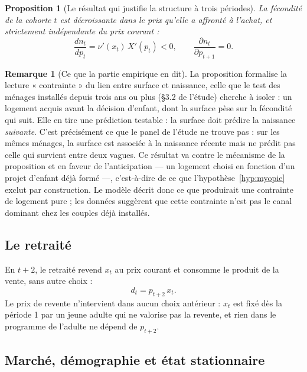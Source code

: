 \documentclass[11pt,a4paper]{article}
\theoremstyle{plain}
\newtheorem{proposition}{Proposition}
\theoremstyle{definition}
\newtheorem{remarque}{Remarque}
\begin{document}
\begin{proposition}[Le résultat qui justifie la structure à trois périodes]\label{prop:coeur}
La fécondité de la cohorte $t$ est décroissante dans le prix qu'elle a affronté à l'achat, et strictement indépendante du prix courant :
\begin{equation}\label{eq:dn-dp}
\frac{d n_t}{d p_t} = \nu'(x_t)\, X'(p_t) < 0 , \qquad \frac{\partial n_t}{\partial p_{t+1}} = 0 .
\end{equation}
\end{proposition}

\begin{remarque}[Ce que la partie empirique en dit]\label{rem:correspondance}
La proposition formalise la lecture « contrainte » du lien entre surface et naissance, celle que le test des ménages installés depuis trois ans ou plus (§3.2 de l'étude) cherche à isoler : un logement acquis avant la décision d'enfant, dont la surface pèse sur la fécondité qui suit. Elle en tire une prédiction testable : la surface doit prédire la naissance \emph{suivante}. C'est précisément ce que le panel de l'étude ne trouve pas : sur les mêmes ménages, la surface est associée à la naissance récente mais ne prédit pas celle qui survient entre deux vagues. Ce résultat va contre le mécanisme de la proposition et en faveur de l'anticipation — un logement choisi en fonction d'un projet d'enfant déjà formé —, c'est-à-dire de ce que l'hypothèse~\ref{hyp:myopie} exclut par construction. Le modèle décrit donc ce que produirait une contrainte de logement pure ; les données suggèrent que cette contrainte n'est pas le canal dominant chez les couples déjà installés.
\end{remarque}

\subsection{Le retraité}

En $t+2$, le retraité revend $x_t$ au prix courant et consomme le produit de la vente, sans autre choix :
\begin{equation}\label{eq:P3}
d_t = p_{t+2}\, x_t .
\end{equation}
Le prix de revente n'intervient dans aucun choix antérieur : $x_t$ est fixé dès la période 1 par un jeune adulte qui ne valorise pas la revente, et rien dans le programme de l'adulte ne dépend de $p_{t+2}$.

\subsection{Marché, démographie et état stationnaire}
\end{document}
